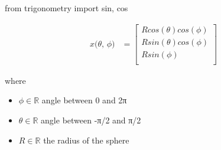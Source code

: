 \documentclass[12pt]{article}
\begin{document}
from trigonometry import sin, cos

\begin{align*}
\textit{x(θ, ϕ)} & = \begin{bmatrix}
\textit{R}cos\left( \textit{θ} \right)cos\left( \textit{ϕ} \right)\\
\textit{R}sin\left( \textit{θ} \right)cos\left( \textit{ϕ} \right)\\
\textit{R}sin\left( \textit{ϕ} \right)\\
\end{bmatrix}
\end{align*}

where
\begin{itemize}
\item $\textit{ϕ} \in \mathbb{{R}}$ angle between 0 and 2π
\item $\textit{θ} \in \mathbb{{R}}$ angle between -π/2 and π/2
\item $\textit{R} \in \mathbb{{R}}$ the radius of the sphere
\end{itemize}
\end{document}

